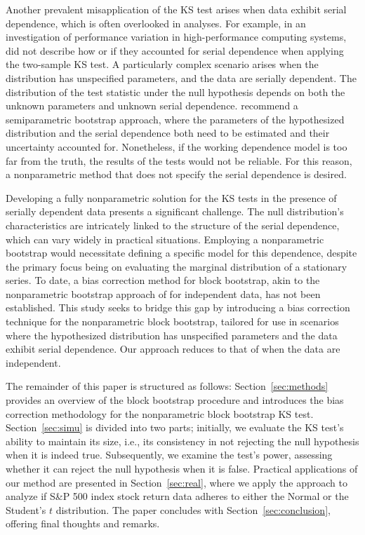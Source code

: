 \documentclass[12pt, titlepage, letterpaper]{article}
\begin{document}
Another prevalent misapplication of the KS test arises when data exhibit serial
dependence, which is often overlooked in analyses. For example, in an
investigation of performance variation in high-performance computing systems,
\citet{tuncer2019ieee} did not describe how or if they accounted for serial
dependence when applying the two-sample KS test.
A particularly complex scenario arises when the distribution has unspecified
parameters, and the data are serially dependent.
The distribution of the test statistic under the null hypothesis depends on both
the unknown parameters and unknown serial dependence. 
\citet{zeimbekakis2022misuses} recommend a semiparametric bootstrap
approach, where the parameters of the hypothesized distribution and the serial
dependence both need to be estimated and their uncertainty accounted for.
Nonetheless, if the working dependence model is too far from the truth, the
results of the tests would not be reliable. For this reason, a nonparametric
method that does not specify the serial dependence is desired.


Developing a fully nonparametric solution for the KS 
tests in the presence of serially dependent data presents a significant 
challenge. The null distribution's characteristics are intricately linked to 
the structure of the serial dependence, which can vary widely in practical 
situations. Employing a nonparametric bootstrap would necessitate defining a 
specific model for this dependence, despite the primary focus being on 
evaluating the marginal distribution of a stationary series. To date, a bias 
correction method for block bootstrap, akin to the nonparametric bootstrap
approach of \citet{babu2004goodness} for independent data,
has not been established. This study seeks 
to bridge this gap by introducing a bias correction technique for the 
nonparametric block bootstrap, tailored for use in scenarios where the 
hypothesized distribution has unspecified parameters and the data 
exhibit serial dependence. Our approach reduces to that of
\citet{babu2004goodness} when the data are independent.


The remainder of this paper is structured as follows: 
Section~\ref{sec:methods} provides an overview of the block bootstrap 
procedure and introduces the bias correction methodology for the 
nonparametric block bootstrap KS test. Section~\ref{sec:simu} is divided 
into two parts; initially, we evaluate the KS test's ability to maintain 
its size, i.e., its consistency in not rejecting the null hypothesis when 
it is indeed true. Subsequently, we examine the test's power, assessing 
whether it can reject the null hypothesis when it is false. Practical 
applications of our method are presented in Section~\ref{sec:real}, where 
we apply the approach to analyze if S\&P 500 index stock return
data adheres to either the Normal or the Student's $t$ distribution. The 
paper concludes with Section~\ref{sec:conclusion}, offering final thoughts 
and remarks.
\end{document}
